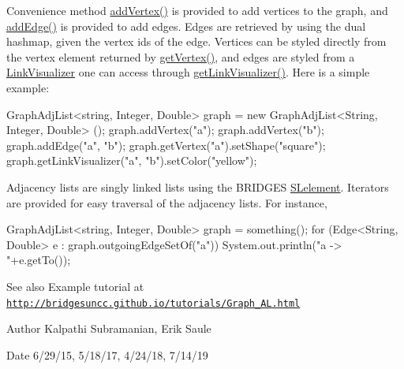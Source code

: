 Convenience method \mbox{\hyperlink{classbridges_1_1base_1_1_graph_adj_list_aca59a3c40af4ae82716ebbfa1751f267}{add\+Vertex()}} is provided to add vertices to the graph, and \mbox{\hyperlink{classbridges_1_1base_1_1_graph_adj_list_a43041976184920e1db1dbe3ad696c6cd}{add\+Edge()}} is provided to add edges. Edges are retrieved by using the dual hashmap, given the vertex ids of the edge. Vertices can be styled directly from the vertex element returned by \mbox{\hyperlink{classbridges_1_1base_1_1_graph_adj_list_aa19cd300a85b05352bdf58720310a112}{get\+Vertex()}}, and edges are styled from a \mbox{\hyperlink{classbridges_1_1base_1_1_link_visualizer}{Link\+Visualizer}} one can access through \mbox{\hyperlink{classbridges_1_1base_1_1_graph_adj_list_af93888dbd2a768a2401619ad5dc95560}{get\+Link\+Visualizer()}}. Here is a simple example\+:


\begin{DoxyCode}
GraphAdjList<string, Integer, Double> graph = \textcolor{keyword}{new} GraphAdjList<String, Integer, Double> ();
graph.addVertex(\textcolor{stringliteral}{"a"});
graph.addVertex(\textcolor{stringliteral}{"b"});
graph.addEdge(\textcolor{stringliteral}{"a"}, \textcolor{stringliteral}{"b"});
graph.getVertex(\textcolor{stringliteral}{"a"}).setShape(\textcolor{stringliteral}{"square"});
graph.getLinkVisualizer(\textcolor{stringliteral}{"a"}, \textcolor{stringliteral}{"b"}).setColor(\textcolor{stringliteral}{"yellow"});
\end{DoxyCode}


Adjacency lists are singly linked lists using the B\+R\+I\+D\+G\+ES \mbox{\hyperlink{classbridges_1_1base_1_1_s_lelement}{S\+Lelement}}. Iterators are provided for easy traversal of the adjacency lists. For instance,


\begin{DoxyCode}
GraphAdjList<string, Integer, Double> graph = something();
\textcolor{keywordflow}{for} (Edge<String, Double> e : graph.outgoingEdgeSetOf(\textcolor{stringliteral}{"a"}))
  System.out.println(\textcolor{stringliteral}{"a -> "}+e.getTo());
\end{DoxyCode}


\begin{DoxySeeAlso}{See also}
Example tutorial at \href{http://bridgesuncc.github.io/tutorials/Graph_AL.html}{\tt http\+://bridgesuncc.\+github.\+io/tutorials/\+Graph\+\_\+\+A\+L.\+html}
\end{DoxySeeAlso}
\begin{DoxyAuthor}{Author}
Kalpathi Subramanian, Erik Saule
\end{DoxyAuthor}
\begin{DoxyDate}{Date}
6/29/15, 5/18/17, 4/24/18, 7/14/19
\end{DoxyDate}

